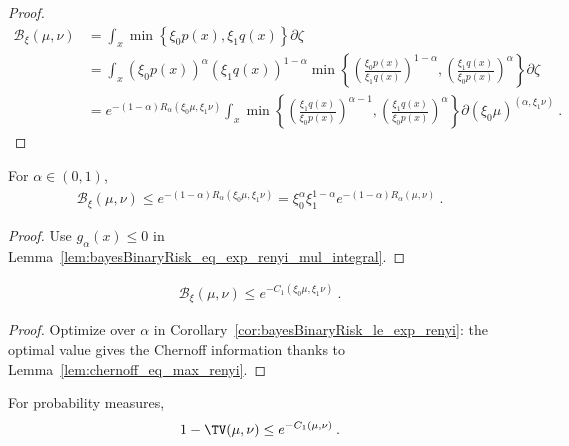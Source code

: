 \begin{proof}%
{}
\begin{align*}
\mathcal B_\xi(\mu, \nu)
&= \int_x \min \left\{\xi_0 p(x), \xi_1 q(x)\right\} \partial\zeta
\\
&= \int_x (\xi_0 p(x))^\alpha (\xi_1 q(x))^{1-\alpha} \min \left\{ \left(\frac{\xi_0p(x)}{\xi_1q(x)}\right)^{1 - \alpha}, \left(\frac{\xi_1q(x)}{\xi_0p(x)}\right)^\alpha\right\} \partial\zeta
\\
&= e^{-(1 - \alpha) R_\alpha(\xi_0\mu, \xi_1\nu)} \int_x \min \left\{ \left(\frac{\xi_1q(x)}{\xi_0p(x)}\right)^{\alpha - 1}, \left(\frac{\xi_1q(x)}{\xi_0p(x)}\right)^\alpha\right\} \partial(\xi_0\mu)^{(\alpha, \xi_1\nu)}
\: .
\end{align*}
\end{proof}


\begin{corollary}
  \label{cor:bayesBinaryRisk_le_exp_renyi}
  For $\alpha \in (0,1)$,
  \begin{align*}
  \mathcal B_\xi(\mu, \nu)
  \le e^{-(1 - \alpha) R_\alpha(\xi_0\mu, \xi_1\nu)}
  = \xi_0^\alpha \xi_1^{1-\alpha} e^{-(1 - \alpha) R_\alpha(\mu, \nu)}
  \: .
  \end{align*}
\end{corollary}

\begin{proof}%
{}
Use $g_\alpha(x) \le 0$ in Lemma~\ref{lem:bayesBinaryRisk_eq_exp_renyi_mul_integral}.
\end{proof}


\begin{lemma}
  \label{lem:bayesBinaryRisk_le_exp_chernoff}
  \begin{align*}
  \mathcal B_\xi(\mu, \nu)
  \le e^{- C_1(\xi_0\mu, \xi_1\nu)}
  \: .
  \end{align*}
\end{lemma}

\begin{proof}%
{}
Optimize over $\alpha$ in Corollary~\ref{cor:bayesBinaryRisk_le_exp_renyi}: the optimal value gives the Chernoff information thanks to Lemma~\ref{lem:chernoff_eq_max_renyi}.
\end{proof}


\begin{lemma}
  \label{lem:one_sub_tv_le_exp_chernoff}
  For probability measures,
  \begin{align*}
  1 - \TV(\mu, \nu) \le e^{- C_1(\mu, \nu)} \: .
  \end{align*}
\end{lemma}

